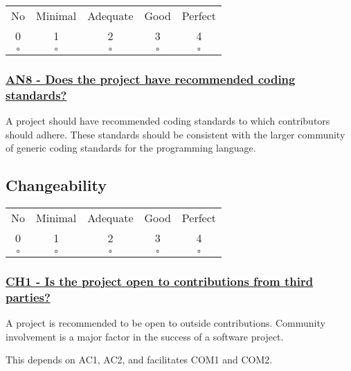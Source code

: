 \documentclass[a4paper,11pt]{article}
\newcommand{\criterion}[2]{\subsubsection*{\underline{#1 - #2}}\label{id:#1}}
\newcommand\CheckTable{%
  \begin{tabular}{ccccc}
    No & Minimal & Adequate & Good & Perfect \\
    0 & 1 & 2 & 3 & 4 \\
    \hline
    $\square$ & $\square$ & $\square$ & $\square$ & $\square$ \\
  \end{tabular}%
}
\begin{document}
\CheckTable

\newcommand{\anEightID}{AN8}
\newcommand{\anEightText}{Does the project have recommended coding standards?}
\criterion{\anEightID}{\anEightText}

A project should have recommended coding standards to which contributors
should adhere. These standards should be consistent with the larger community
of generic coding standards for the programming language.

\subsection{Changeability}\label{sec:cha}
%
%
%

\CheckTable

\newcommand{\chOneID}{CH1}
\newcommand{\chOneText}{Is the project open to contributions from third parties?}
\criterion{\chOneID}{\chOneText}

A project is recommended to be open to outside contributions. Community
involvement is a major factor in the success of a software project. 

This depends on AC1, AC2, and facilitates COM1 and COM2. 
\end{document}
